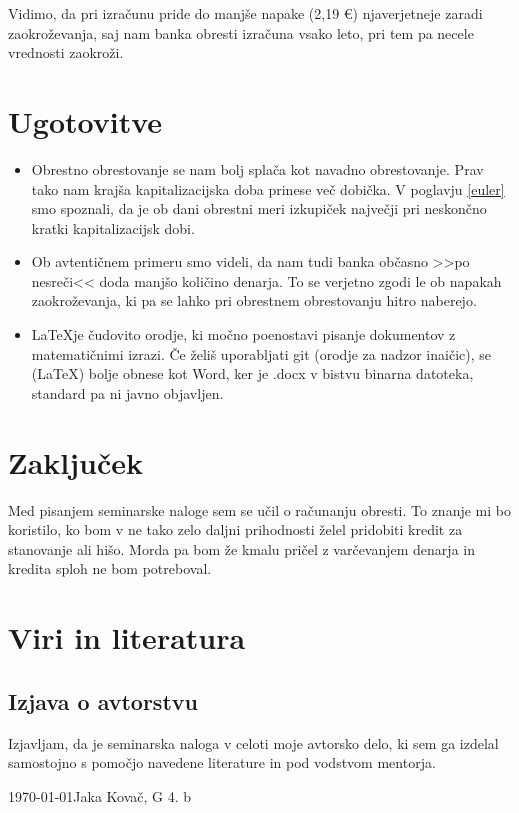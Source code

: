 \documentclass[12pt]{article}
\begin{document}
    Vidimo, da pri izračunu pride do manjše napake (2,19 €) njaverjetneje zaradi zaokroževanja,
    saj nam banka obresti izračuna vsako leto, pri tem pa necele vrednosti zaokroži.

    \newpage

\section{Ugotovitve}
    \begin{itemize}
        \item Obrestno obrestovanje se nam bolj splača kot navadno obrestovanje. Prav tako nam
        krajša kapitalizacijska doba prinese več dobička. V poglavju \ref{euler} smo spoznali,
        da je ob dani obrestni meri izkupiček največji pri neskončno kratki kapitalizacijsk dobi.
        \item Ob avtentičnem primeru smo videli, da nam tudi banka občasno >>po nesreči<< 
        doda manjšo količino denarja. To se verjetno zgodi le ob napakah zaokroževanja, ki
        pa se lahko pri obrestnem obrestovanju hitro naberejo.
        \item \LaTeX je čudovito orodje, ki močno poenostavi pisanje dokumentov z matematičnimi
        izrazi. Če želiš uporabljati git (orodje za nadzor inaičic), se (\LaTeX) bolje obnese kot Word,
        ker je .docx v bistvu binarna datoteka, standard pa ni javno objavljen.
    \end{itemize}

\newpage
\section{Zaključek}
    Med pisanjem seminarske naloge sem se učil o računanju obresti. To znanje mi bo koristilo,
    ko bom v ne tako zelo daljni prihodnosti želel pridobiti kredit za stanovanje ali hišo.
    Morda pa bom že kmalu pričel z varčevanjem denarja in kredita sploh ne bom potreboval. 



\newpage
\begingroup
\makeatletter
    \section{Viri in literatura}
    \nocite{*}
    \printbibliography[heading=none]
\makeatother
\endgroup
\newpage

\begin{samepage}
    \thispagestyle{empty}
    \section*{Izjava o avtorstvu}
    Izjavljam, da je seminarska naloga v celoti moje avtorsko delo, ki sem ga 
    izdelal samostojno s pomočjo navedene literature in pod vodstvom mentorja.

    \vfill
    
    \today \hfill Jaka Kovač, G 4. b
    
    \vspace{3 cm}
\end{samepage}
\end{document}
